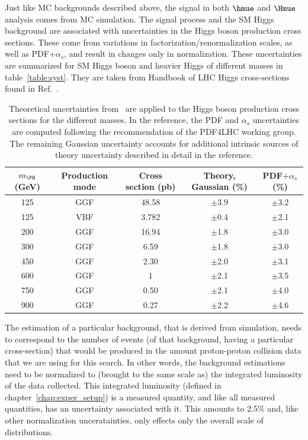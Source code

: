 Just like MC backgrounds described above, the signal in both $\hmue$ and $\Hmue$ analysis comes from MC simulation. The signal process and the SM Higgs background are associated with uncertainties in the Higgs boson production cross sections. These come from variations in factorization/renormalization scales, as well as PDF+$\alpha_s$, and result in changes only in normalization. These uncertainties are summarized for SM Higgs boson and heavier Higgs of different masses in table~\ref{table:syst}. They are taken from Handbook of LHC Higgs cross-sections found in Ref.~\cite{YR4}.

\begin{table}[!htbp]
  \begin{center}
  \caption{ Theoretical uncertainties from~\cite{YR4} are applied to the Higgs boson production cross sections for the different masses. In the reference, the PDF and $\alpha_s$ uncertainties are computed following the recommendation of the PDF4LHC working group. The remaining Gaussian uncertainty accounts for additional intrinsic sources of theory uncertainty described in detail in the reference.}
  \begin{tabular} {ccccc}
    \hline
    $m_{\PH}$  (GeV) &Production mode& Cross section (pb) &Theory, Gaussian (\%) & PDF$+\alpha_s$  (\%)\\\hline
125 & GGF&48.58
&$\pm$3.9
&$\pm$3.2\\
125 & VBF&3.782
&$\pm$0.4
&$\pm$2.1\\
200 & GGF &16.94
&$\pm$1.8
&$\pm$3.0\\
300&GGF&6.59
&$\pm$1.8
&$\pm$3.0\\
450&GGF
&2.30
&$\pm$2.0
&$\pm$3.1\\
600&GGF
&1
&$\pm$2.1
&$\pm$3.5\\
750&GGF
&0.50
&$\pm$2.1
&$\pm$4.0\\
900&GGF
& 0.27
&$\pm$2.2
&$\pm$4.6\\\hline
  \end{tabular}
  \label{tabe:syst_signal}
\end{center}
\end{table}



The estimation of a particular background, that is derived from simulation, needs to correspond to the number of events (of that background, having a particular cross-section) that would be produced in the amount proton-proton collision data that we are using for this search. In other words, the background estimations need to be normalized to (brought to the same scale as) the integrated luminosity of the data collected. This integrated luminosity (defined in chapter~\ref{chap:exper_setup}) is a measured quantity, and like all measured quantities, has an uncertainty associated with it. This amounts to 2.5\% and, like other normalization unceratainties, only effects only the overall scale of distributions.  




